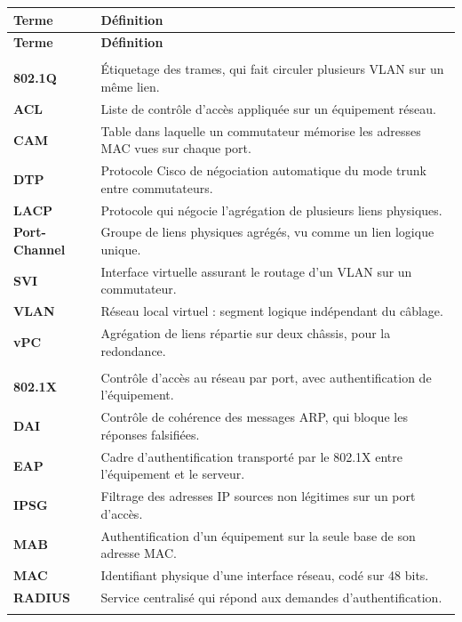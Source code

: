 \documentclass[11pt,a4paper]{article}
\newcommand{\gt}[1]{\strut{\sffamily\bfseries\color{primary}#1}}
\renewcommand{\arraystretch}{1.08}
\begin{document}
\vspace{6pt}
{\small\renewcommand{\arraystretch}{1.0}
\begin{longtable}{L{2.9cm} L{12.8cm}}
\toprule
{}\gt{Terme} & \strut\textbf{\sffamily Définition} \\
\midrule
\endfirsthead
\toprule
{}\gt{Terme} & \strut\textbf{\sffamily Définition} \\
\midrule
\endhead

 \\
\gt{802.1Q} & Étiquetage des trames, qui fait circuler plusieurs VLAN sur un même lien. \\
\gt{ACL} & Liste de contrôle d'accès appliquée sur un équipement réseau. \\
\gt{CAM} & Table dans laquelle un commutateur mémorise les adresses MAC vues sur chaque port. \\
\gt{DTP} & Protocole Cisco de négociation automatique du mode trunk entre commutateurs. \\
\gt{LACP} & Protocole qui négocie l'agrégation de plusieurs liens physiques. \\
\gt{Port-Channel} & Groupe de liens physiques agrégés, vu comme un lien logique unique. \\
\gt{SVI} & Interface virtuelle assurant le routage d'un VLAN sur un commutateur. \\
\gt{VLAN} & Réseau local virtuel : segment logique indépendant du câblage. \\
\gt{vPC} & Agrégation de liens répartie sur deux châssis, pour la redondance. \\
\addlinespace[2pt]

 \\
\gt{802.1X} & Contrôle d'accès au réseau par port, avec authentification de l'équipement. \\
\gt{DAI} & Contrôle de cohérence des messages ARP, qui bloque les réponses falsifiées. \\
\gt{EAP} & Cadre d'authentification transporté par le 802.1X entre l'équipement et le serveur. \\
\gt{IPSG} & Filtrage des adresses IP sources non légitimes sur un port d'accès. \\
\gt{MAB} & Authentification d'un équipement sur la seule base de son adresse MAC. \\
\gt{MAC} & Identifiant physique d'une interface réseau, codé sur 48 bits. \\
\gt{RADIUS} & Service centralisé qui répond aux demandes d'authentification. \\
\addlinespace[2pt]


\end{longtable}}
\end{document}
